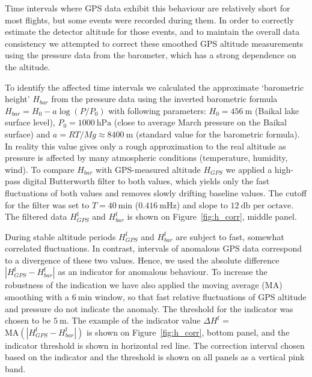 \documentclass[universe,article,submit,moreauthors,pdftex]{Definitions/mdpi}
\begin{document}
\begin{paracol}{2}
Time intervals where GPS data exhibit this behaviour are relatively short for most flights, but some events were recorded during them. In order to correctly estimate the detector altitude for those events, and to maintain the overall data consistency we attempted to correct these smoothed GPS altitude measurements using the pressure data from the barometer, which has a strong dependence on the altitude.

To identify the affected time intervals we calculated the approximate `barometric height' $H_{bar}$ from the pressure data using the inverted barometric formula $H_{bar} = H_0 - a \log (P/P_0)$ with following parameters: $H_0 = 456~\textrm{m}$ (Baikal lake surface level), $P_0 = 1000~\textrm{hPa}$ (close to average March pressure on the Baikal surface) and $a = {RT}/{Mg} \approx 8400~\textrm{m}$ (standard value for the barometric formula). In reality this value gives only a rough approximation to the real altitude as pressure is affected by many atmospheric conditions (temperature, humidity, wind). To compare $H_{bar}$ with GPS-measured altitude $H_{GPS}$ we applied a high-pass digital Butterworth filter to both values, which yields only the fast fluctuations of both values and removes slowly drifting baseline values. The cutoff for the filter was set to $T=40~\textrm{min}$ ($0.416~\textrm{mHz}$) and slope to $12~\textrm{db per octave}$. The filtered data $H_{GPS}^{\textrm{f}}$ and $H_{bar}^{\textrm{f}}$ is shown on Figure~\ref{fig:h_corr}, middle panel.

During stable altitude periods $H_{GPS}^{\textrm{f}}$ and $H_{bar}^{\textrm{f}}$ are subject to fast, somewhat correlated fluctuations. In contrast, intervals of anomalous GPS data correspond to a divergence of these two values. Hence, we used the absolute difference $|H_{GPS}^{\textrm{f}} - H_{bar}^{\textrm{f}}|$ as an indicator for anomalous behaviour. To increase the robustness of the indication we have also applied the moving average (MA) smoothing with a $6~\textrm{min}$ window, so that fast relative fluctuations of GPS altitude and pressure do not indicate the anomaly. The threshold for the indicator was chosen to be $5~\textrm{m}$. The example of the indicator value $\Delta H^\textrm{f}$ = $\textrm{MA}(|H_{GPS}^{\textrm{f}} - H_{bar}^{\textrm{f}}|)$ is shown on Figure~\ref{fig:h_corr}, bottom panel, and the indicator threshold is shown in horizontal red line. The correction interval chosen based on the indicator and the threshold is shown on all panels as a vertical pink band.


\end{paracol}
\end{document}
